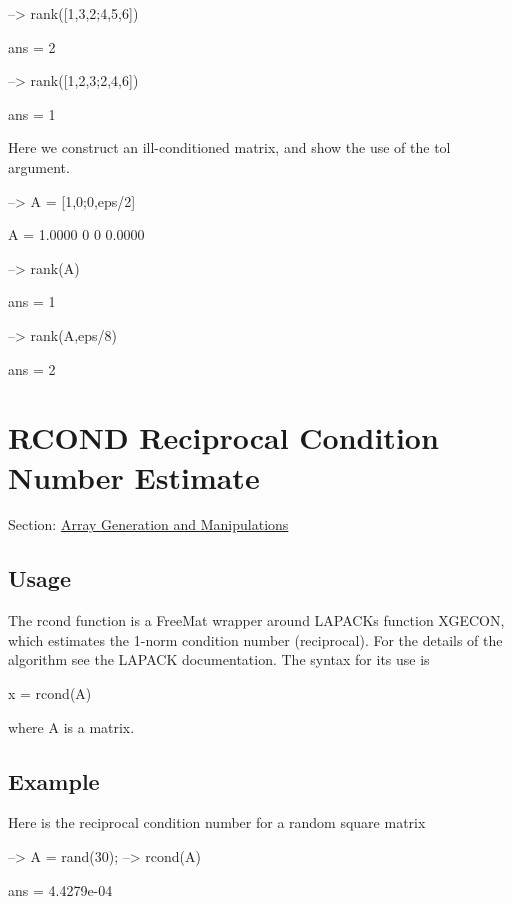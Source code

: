 \begin{DoxyVerbInclude}
--> rank([1,3,2;4,5,6])

ans = 
 2 

--> rank([1,2,3;2,4,6])

ans = 
 1 
\end{DoxyVerbInclude}


Here we construct an ill-\/conditioned matrix, and show the use of the {\ttfamily tol} argument.


\begin{DoxyVerbInclude}
--> A = [1,0;0,eps/2]

A = 
    1.0000         0 
         0    0.0000 

--> rank(A)

ans = 
 1 

--> rank(A,eps/8)

ans = 
 2 
\end{DoxyVerbInclude}
 \hypertarget{array_rcond}{}\section{R\-C\-O\-N\-D Reciprocal Condition Number Estimate}\label{array_rcond}
Section\-: \hyperlink{sec_array}{Array Generation and Manipulations} \hypertarget{vtkwidgets_vtkxyplotwidget_Usage}{}\subsection{Usage}\label{vtkwidgets_vtkxyplotwidget_Usage}
The {\ttfamily rcond} function is a Free\-Mat wrapper around L\-A\-P\-A\-C\-Ks function {\ttfamily X\-G\-E\-C\-O\-N}, which estimates the 1-\/norm condition number (reciprocal). For the details of the algorithm see the L\-A\-P\-A\-C\-K documentation. The syntax for its use is \begin{DoxyVerb}   x = rcond(A)
\end{DoxyVerb}
 where {\ttfamily A} is a matrix. \hypertarget{variables_struct_Example}{}\subsection{Example}\label{variables_struct_Example}
Here is the reciprocal condition number for a random square matrix


\begin{DoxyVerbInclude}
--> A = rand(30);
--> rcond(A)

ans = 
 4.4279e-04 
\end{DoxyVerbInclude}


